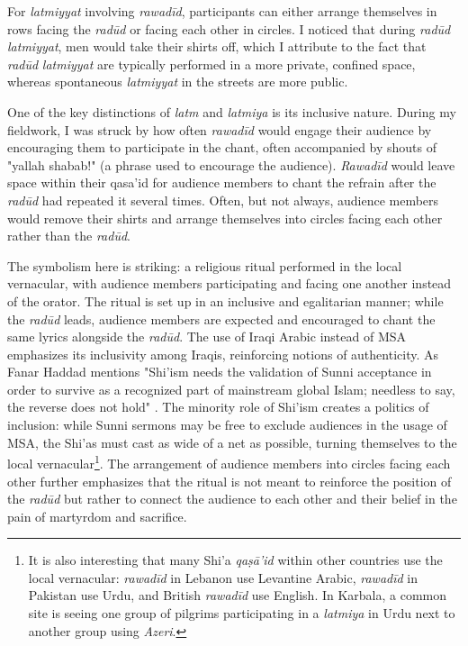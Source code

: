For \emph{latmiyyat} involving \emph{rawadīd}, participants can either arrange themselves in rows facing the \emph{radūd} or facing each other in circles. I noticed that during \emph{radūd} \emph{latmiyyat}, men would take their shirts off, which I attribute to the fact that \emph{radūd} \emph{latmiyyat} are typically performed in a more private, confined space, whereas spontaneous \emph{latmiyyat} in the streets are more public.

One of the key distinctions of \emph{latm} and \emph{latmiya} is its inclusive nature. During my fieldwork, I was struck by how often \emph{rawadīd} would engage their audience by encouraging them to participate in the chant, often accompanied by shouts of "yallah shabab!" (a phrase used to encourage the audience). \emph{Rawadīd} would leave space within their qasa'id for audience members to chant the refrain after the \emph{radūd} had repeated it several times. Often, but not always, audience members would remove their shirts and arrange themselves into circles facing each other rather than the \emph{radūd}.

The symbolism here is striking: a religious ritual performed in the local vernacular, with audience members participating and facing one another instead of the orator. The ritual is set up in an inclusive and egalitarian manner; while the \emph{radūd} leads, audience members are expected and encouraged to chant the same lyrics alongside the \emph{radūd}. The use of Iraqi Arabic instead of MSA emphasizes its inclusivity among Iraqis, reinforcing notions of authenticity. As Fanar Haddad mentions "Shi'ism needs the validation of Sunni acceptance in order to survive as a recognized part of mainstream global Islam; needless to say, the reverse does not hold" \cite[179]{haddad_understanding_2020}. The minority role of Shi'ism creates a politics of inclusion: while Sunni sermons may be free to exclude audiences in the usage of MSA, the Shi'as must cast as wide of a net as possible, turning themselves to the local vernacular\footnote{It is also interesting that many Shi'a \emph{qaṣā’id} within other countries use the local vernacular: \emph{rawadīd} in Lebanon use Levantine Arabic, \emph{rawadīd} in Pakistan use Urdu, and British \emph{rawadīd} use English. In Karbala, a common site is seeing one group of pilgrims participating in a \emph{latmiya} in Urdu next to another group using \emph{Azeri}. 
}. The arrangement of audience members into circles facing each other further emphasizes that the ritual is not meant to reinforce the position of the \emph{radūd} but rather to connect the audience to each other and their belief in the pain of martyrdom and sacrifice.


